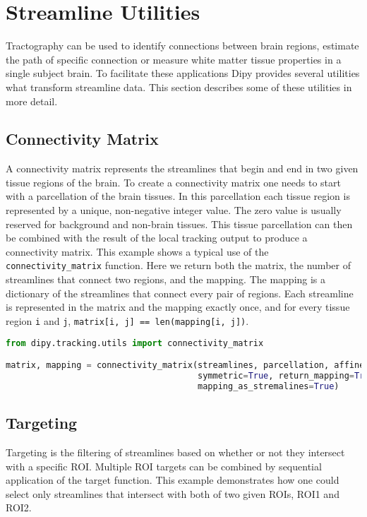 \section{Streamline Utilities}

Tractography can be used to identify connections between brain regions, estimate the path of specific connection or measure white matter tissue properties in a single subject brain. To facilitate these applications Dipy provides several utilities what transform streamline data. This section describes some of these utilities in more detail.

\subsection{Connectivity Matrix}
A connectivity matrix represents the streamlines that begin and end in two given tissue regions of the brain. To create a connectivity matrix one needs to start with a parcellation of the brain tissues. In this parcellation each tissue region is represented by a unique, non-negative integer value. The zero value is usually reserved for background and non-brain tissues. This tissue parcellation can then be combined with the result of the local tracking output to produce a connectivity matrix. This example shows a typical use of the \verb|connectivity_matrix| function. Here we return both the matrix, the number of streamlines that connect two regions, and the mapping. The mapping is a dictionary of the streamlines that connect every pair of regions. Each streamline is represented in the matrix and the mapping exactly once, and for every tissue region \verb|i| and \verb|j|, \verb|matrix[i, j] == len(mapping[i, j])|.

\begin{lstlisting}[language=python]
from dipy.tracking.utils import connectivity_matrix

matrix, mapping = connectivity_matrix(streamlines, parcellation, affine=affine,
                                      symmetric=True, return_mapping=True,
                                      mapping_as_stremalines=True)
\end{lstlisting}

\subsection{Targeting}
Targeting is the filtering of streamlines based on whether or not they intersect with a specific ROI. Multiple ROI targets can be combined by sequential application of the target function. This example demonstrates how one could select only streamlines that intersect with both of two given ROIs, ROI1 and ROI2.

